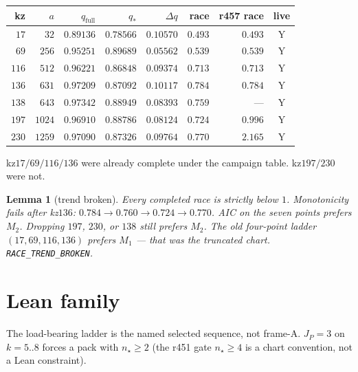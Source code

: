 \documentclass[11pt]{article}
\newtheorem{lemma}{Lemma}
\begin{document}
\begin{center}
\small
\begin{tabular}{@{}rrrrrrrc@{}}
\toprule
kz & $a$ & $q_{\mathrm{full}}$ & $q_*$ &
 $\Delta q$ & race & r457 race & live \\
\midrule
$17$  & $32$   & $0.89136$ & $0.78566$ &
 $0.10570$ & $0.493$ & $0.493$ & Y \\
$69$  & $256$  & $0.95251$ & $0.89689$ &
 $0.05562$ & $0.539$ & $0.539$ & Y \\
$116$ & $512$  & $0.96221$ & $0.86848$ &
 $0.09374$ & $0.713$ & $0.713$ & Y \\
$136$ & $631$  & $0.97209$ & $0.87092$ &
 $0.10117$ & $0.784$ & $0.784$ & Y \\
$138$ & $643$  & $0.97342$ & $0.88949$ &
 $0.08393$ & $0.759$ & --- & Y \\
$197$ & $1024$ & $0.96910$ & $0.88786$ &
 $0.08124$ & $0.724$ & $0.996$ & Y \\
$230$ & $1259$ & $0.97090$ & $0.87326$ &
 $0.09764$ & $0.770$ & $2.165$ & Y \\
\bottomrule
\end{tabular}
\end{center}

kz$17/69/116/136$ were already complete
under the campaign table.
kz$197/230$ were not.

\begin{lemma}[trend broken]\label{lem:broken}
Every completed race is strictly below $1$.
Monotonicity fails after kz$136$:
$0.784\to 0.760\to 0.724\to 0.770$.
AIC on the seven points prefers $M_2$.
Dropping $197$, $230$, or $138$ still
prefers $M_2$.
The old four-point ladder
$(17,69,116,136)$ prefers $M_1$ ---
that was the truncated chart.
\texttt{RACE\_TREND\_BROKEN}.
\end{lemma}

\section{Lean family}\label{sec:B}

The load-bearing ladder is the named
selected sequence, not frame-A.
$J_P=3$ on $k=5..8$ forces a pack with
$n_{\star}\ge 2$ (the r451 gate $n_{\star}\ge 4$
is a chart convention, not a Lean
constraint).
\end{document}
